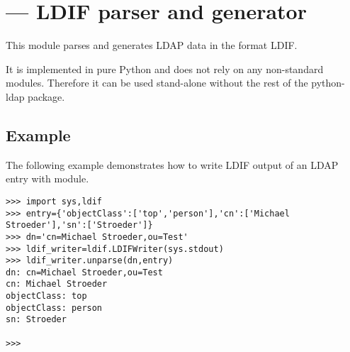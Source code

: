 

\section{ ---
         LDIF parser and generator}






This module parses and generates LDAP data in the format LDIF.

It is implemented in pure Python and does not rely on any
non-standard modules. Therefore it can be used stand-alone without
the rest of the python-ldap package.

\begin{seealso}
\end{seealso}

\subsection{Example \label{ldif-example}}

The following example demonstrates how to write LDIF output
of an LDAP entry with  module.

\begin{verbatim}
>>> import sys,ldif
>>> entry={'objectClass':['top','person'],'cn':['Michael Stroeder'],'sn':['Stroeder']}
>>> dn='cn=Michael Stroeder,ou=Test'
>>> ldif_writer=ldif.LDIFWriter(sys.stdout)
>>> ldif_writer.unparse(dn,entry)
dn: cn=Michael Stroeder,ou=Test
cn: Michael Stroeder
objectClass: top
objectClass: person
sn: Stroeder

>>> 
\end{verbatim}

